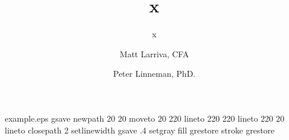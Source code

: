 \begin{filecontents*}{example.eps}
gsave
newpath
  20 20 moveto
  20 220 lineto
  220 220 lineto
  220 20 lineto
closepath
2 setlinewidth
gsave
  .4 setgray fill
grestore
stroke
grestore
\end{filecontents*}

\RequirePackage{fix-cm}
\documentclass{svjour3}                     %
\smartqed  %
\usepackage{graphicx}


\usepackage{natbib}
\usepackage{csvsimple}
\usepackage{breakcites}
\usepackage{caption}
\usepackage{blindtext}
\usepackage{amsmath}
\usepackage{float}
\usepackage{graphicx}
\usepackage{geometry}
\usepackage{longtable,array}
\usepackage{subfig}
\usepackage{graphicx}
\usepackage{url}
\usepackage{pdflscape}


\title{x}
\date{}
\subtitle{x}
\author{Matt Larriva, CFA         \and
        Peter Linneman, PhD.
}




\maketitle

